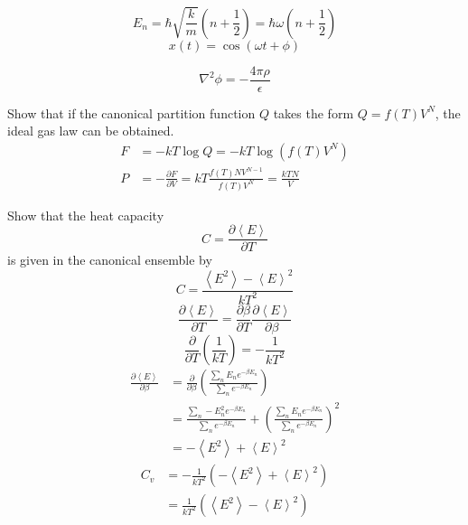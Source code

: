 \documentclass[letterpaper]{article}
\providecommand{\ainner}[1]{\left\langle#1\right\rangle}
\begin{document}
\begin{multicols}{2}
\[
E_n=\hbar\sqrt{\frac{k}{m}}\left(n+\frac{1}{2}\right)
=\hbar\omega\left(n+\frac{1}{2}\right)
\]
\[
x(t)=\cos(\omega t+\phi)
\]

\[
\nabla^2\phi=-\frac{4\pi\rho}{\epsilon}
\]

Show that if the canonical partition function $Q$ takes the form $Q=f(T)V^N$,
the ideal gas law can be obtained.
\begin{align*}
F&= -kT\log Q=-kT\log(f(T)V^N)\\
P&=-\frac{\partial F}{\partial V}=kT\frac{f(T)NV^{N-1}}{f(T)V^N}=\frac{kTN}{V}
\end{align*}

Show that the heat capacity
\[
C=\frac{\partial\ainner{E}}{\partial T}
\]
is given in the canonical ensemble by
\[
C=\frac{\ainner{E^2}-\ainner{E}^2}{kT^2}
\]
\[
\frac{\partial\ainner{E}}{\partial T}=\frac{\partial\beta}{\partial T}
\frac{\partial\ainner{E}}{\partial\beta}
\]
\[
\frac{\partial}{\partial T}\left(\frac{1}{kT}\right)
=-\frac{1}{kT^2}
\]
\begin{align*}
\frac{\partial\ainner{E}}{\partial\beta}&=\frac{\partial}{\partial\beta}\left(
\frac{\sum_nE_ne^{-\beta E_n}}{\sum_ne^{-\beta E_n}}\right)\\
&=\frac{\sum_n-E_n^2e^{-\beta E_n}}{\sum_ne^{-\beta E_n}}
+\left(\frac{\sum_nE_ne^{-\beta E_n}}{\sum_ne^{-\beta E_n}}\right)^2\\
&=-\ainner{E^2}+\ainner{E}^2
\end{align*}
\begin{align*}
C_v&=-\frac{1}{kT^2}(-\ainner{E^2}+\ainner{E}^2)\\
&=\frac{1}{kT^2}(\ainner{E^2}-\ainner{E}^2)
\end{align*}


\end{multicols}
\end{document}
